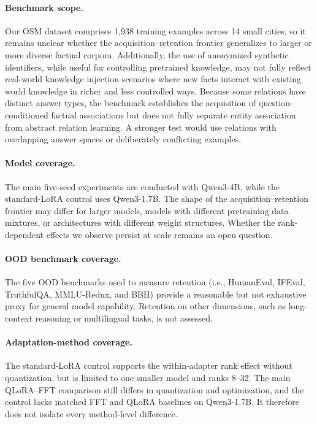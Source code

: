 \documentclass[11pt]{article}
\begin{document}
\paragraph{Benchmark scope.}
Our OSM dataset comprises 1,938 training examples across 14 small cities, 
so it remains unclear whether the acquisition--retention frontier generalizes 
to larger or more diverse factual corpora. 
Additionally, the use of anonymized synthetic identifiers, 
while useful for controlling pretrained knowledge, 
may not fully reflect real-world knowledge injection scenarios 
where new facts interact with existing world knowledge in richer 
and less controlled ways.
Because some relations have distinct answer types, the benchmark establishes
the acquisition of question-conditioned factual associations but does not fully
separate entity association from abstract relation learning. A stronger test
would use relations with overlapping answer spaces or deliberately conflicting
examples.

\paragraph{Model coverage.}
The main five-seed experiments are conducted with Qwen3-4B, while the
standard-LoRA control uses Qwen3-1.7B.
The shape of the acquisition--retention frontier may differ for larger models, 
models with different pretraining data mixtures, or architectures 
with different weight structures. 
Whether the rank-dependent effects we observe persist at scale remains an open question.

\paragraph{OOD benchmark coverage.}
The five OOD benchmarks used to measure retention
(i.e., HumanEval, IFEval, TruthfulQA, MMLU-Redux, and BBH)
provide a reasonable but not exhaustive proxy for general model capability. 
Retention on other dimensions, such as long-context reasoning or multilingual tasks, 
is not assessed.

\paragraph{Adaptation-method coverage.}
The standard-LoRA control supports the within-adapter rank effect without
quantization, but is limited to one smaller model and ranks 8--32. The main
QLoRA--FFT comparison still differs in quantization and optimization, and the
control lacks matched FFT and QLoRA baselines on Qwen3-1.7B. It therefore does
not isolate every method-level difference.
\end{document}
